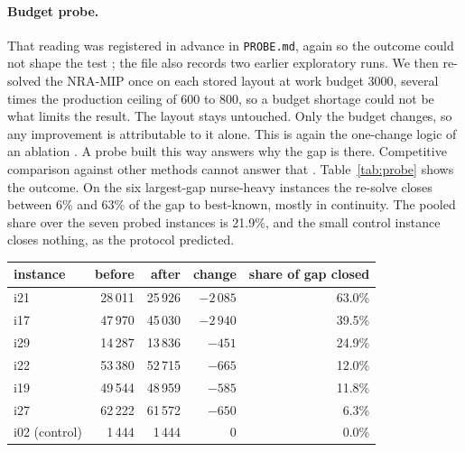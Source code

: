 \documentclass[11pt]{article}
\begin{document}
	\paragraph{Budget probe.} That reading was registered in advance in \texttt{PROBE.md}, again so the outcome could not shape the test \citep{nosek2018}; the file also records two earlier exploratory runs. We then re-solved the NRA-MIP once on each stored layout at work budget 3000, several times the production ceiling of 600 to 800, so a budget shortage could not be what limits the result. The layout stays untouched. Only the budget changes, so any improvement is attributable to it alone. This is again the one-change logic of an ablation \citep{fawcett2016}. A probe built this way answers why the gap is there. Competitive comparison against other methods cannot answer that \citep{hooker1995}. Table~\ref{tab:probe} shows the outcome. On the six largest-gap
	nurse-heavy instances the re-solve closes between 6\% and 63\% of the gap to best-known, mostly in
	continuity. The pooled share over the seven probed instances is 21.9\%, and the small control
	instance closes nothing, as the protocol predicted.

	\begin{center}
		\label{tab:probe}
		\small
		\begin{tabular}{@{}lrrrr@{}}
			\toprule
			instance & before & after & change & share of gap closed\\
			\midrule
			i21 & 28\,011 & 25\,926 & $-2\,085$ & 63.0\%\\
			i17 & 47\,970 & 45\,030 & $-2\,940$ & 39.5\%\\
			i29 & 14\,287 & 13\,836 & $-451$ & 24.9\%\\
			i22 & 53\,380 & 52\,715 & $-665$ & 12.0\%\\
			i19 & 49\,544 & 48\,959 & $-585$ & 11.8\%\\
			i27 & 62\,222 & 61\,572 & $-650$ & 6.3\%\\
			i02 (control) & 1\,444 & 1\,444 & $0$ & 0.0\%\\
			\bottomrule
		\end{tabular}
	\end{center}
\end{document}
